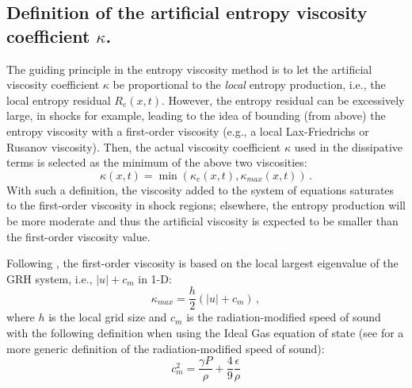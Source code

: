 \documentclass[times,doublespace]{fldauth}%
\begin{document}
\subsection{Definition of the artificial entropy viscosity coefficient $\kappa$.}\label{sec:visc-coeff-def}
%
The guiding principle in the entropy viscosity method \cite{jlg1, jlg2} is to let the artificial viscosity coefficient $\kappa$ be proportional to the \emph{local} entropy
production, i.e., the local entropy residual $R_e(x,t)$. However, the entropy residual can be excessively large, in shocks for example, leading
to the idea of bounding (from above) the entropy viscosity with a first-order viscosity (e.g., a local Lax-Friedrichs or Rusanov viscosity).
Then, the actual viscosity coefficient $\kappa$ used in the dissipative terms %
is selected as the minimum of the above two viscosities:  
%
\begin{equation}
\kappa(x,t) = \min ( \kappa_e(x,t), \kappa_{max}(x,t) ) \, . 
\end{equation}
%
With such a definition, the viscosity added to the system of equations saturates to the first-order viscosity in shock regions; elsewhere, 
the entropy production will be more moderate and thus the artificial viscosity is expected to be smaller
than the first-order viscosity value.

Following \cite{our_jcp_radhy_paper}, the first-order viscosity is based on the local largest eigenvalue of the GRH system, i.e., $|u| + c_m$ in 1-D:
%
\begin{equation}
\label{eq:equation8}
\kappa_{max} = \frac{h}{2} \left( |u| + c_m \right) \,,
\end{equation}  
%
where $h$ is the local grid size and $c_m$ is the radiation-modified speed of sound with the following definition when using the Ideal Gas equation of state (see \cite{our_jcp_radhy_paper} for a more generic definition of the radiation-modified speed of sound):
%
\begin{equation}
c_m^2 = \frac{ \gamma P}{\rho} + \frac{4}{9} \frac{\epsilon}{\rho}
\end{equation}
%
\end{document}
